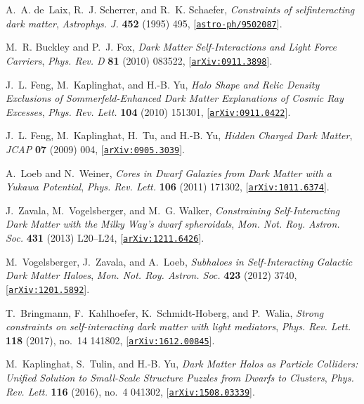 \documentclass[prd,nofootinbib,preprint,superscriptaddress]{revtex4}
\begin{document}
\begin{thebibliography}{100}
A.~A. de~Laix, R.~J. Scherrer, and R.~K. Schaefer, {\it {Constraints of
  selfinteracting dark matter}},  {\em Astrophys. J.} {\bf 452} (1995) 495,
  [\href{http://arxiv.org/abs/astro-ph/9502087}{{\tt astro-ph/9502087}}].

M.~R. Buckley and P.~J. Fox, {\it {Dark Matter Self-Interactions and Light
  Force Carriers}},  {\em Phys. Rev. D} {\bf 81} (2010) 083522,
  [\href{http://arxiv.org/abs/0911.3898}{{\tt arXiv:0911.3898}}].

J.~L. Feng, M.~Kaplinghat, and H.-B. Yu, {\it {Halo Shape and Relic Density
  Exclusions of Sommerfeld-Enhanced Dark Matter Explanations of Cosmic Ray
  Excesses}},  {\em Phys. Rev. Lett.} {\bf 104} (2010) 151301,
  [\href{http://arxiv.org/abs/0911.0422}{{\tt arXiv:0911.0422}}].

J.~L. Feng, M.~Kaplinghat, H.~Tu, and H.-B. Yu, {\it {Hidden Charged Dark
  Matter}},  {\em JCAP} {\bf 07} (2009) 004,
  [\href{http://arxiv.org/abs/0905.3039}{{\tt arXiv:0905.3039}}].

A.~Loeb and N.~Weiner, {\it {Cores in Dwarf Galaxies from Dark Matter with a
  Yukawa Potential}},  {\em Phys. Rev. Lett.} {\bf 106} (2011) 171302,
  [\href{http://arxiv.org/abs/1011.6374}{{\tt arXiv:1011.6374}}].

J.~Zavala, M.~Vogelsberger, and M.~G. Walker, {\it {Constraining
  Self-Interacting Dark Matter with the Milky Way's dwarf spheroidals}},  {\em
  Mon. Not. Roy. Astron. Soc.} {\bf 431} (2013) L20--L24,
  [\href{http://arxiv.org/abs/1211.6426}{{\tt arXiv:1211.6426}}].

M.~Vogelsberger, J.~Zavala, and A.~Loeb, {\it {Subhaloes in Self-Interacting
  Galactic Dark Matter Haloes}},  {\em Mon. Not. Roy. Astron. Soc.} {\bf 423}
  (2012) 3740, [\href{http://arxiv.org/abs/1201.5892}{{\tt arXiv:1201.5892}}].

T.~Bringmann, F.~Kahlhoefer, K.~Schmidt-Hoberg, and P.~Walia, {\it {Strong
  constraints on self-interacting dark matter with light mediators}},  {\em
  Phys. Rev. Lett.} {\bf 118} (2017), no.~14 141802,
  [\href{http://arxiv.org/abs/1612.00845}{{\tt arXiv:1612.00845}}].

M.~Kaplinghat, S.~Tulin, and H.-B. Yu, {\it {Dark Matter Halos as Particle
  Colliders: Unified Solution to Small-Scale Structure Puzzles from Dwarfs to
  Clusters}},  {\em Phys. Rev. Lett.} {\bf 116} (2016), no.~4 041302,
  [\href{http://arxiv.org/abs/1508.03339}{{\tt arXiv:1508.03339}}].


\end{thebibliography}
\end{document}
